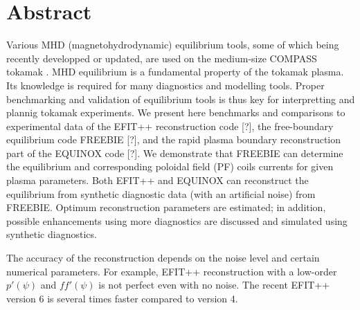 \section{Abstract}

Various MHD (magnetohydrodynamic) equilibrium tools, some of which being recently developped or updated, are used on the medium-size COMPASS tokamak \cite{P_nek_2006}. MHD equilibrium is a fundamental property of the tokamak plasma. Its knowledge is required for many diagnostics and modelling tools. Proper benchmarking and validation of equilibrium tools is thus key for interpretting and plannig tokamak experiments. We present here benchmarks and comparisons to experimental data of the EFIT++ reconstruction code [?], the free-boundary equilibrium code FREEBIE [?], and the rapid plasma boundary reconstruction part of the EQUINOX code [?]. We demonstrate that FREEBIE can determine the equilibrium and corresponding poloidal field (PF) coils currents for given plasma parameters. Both EFIT++ and EQUINOX can reconstruct the equilibrium from synthetic diagnostic data (with an artificial noise) from FREEBIE. Optimum reconstruction parameters are estimated; in addition, possible enhancements using more diagnostics are discussed and simulated using synthetic diagnostics.

The accuracy of the reconstruction depends on the noise level and certain numerical parameters. For example, EFIT++ reconstruction with a low-order $p'\left(\psi\right)$ and $ff'\left(\psi\right)$ is not perfect even with no noise. The recent EFIT++ version 6 is several times faster compared to version 4.